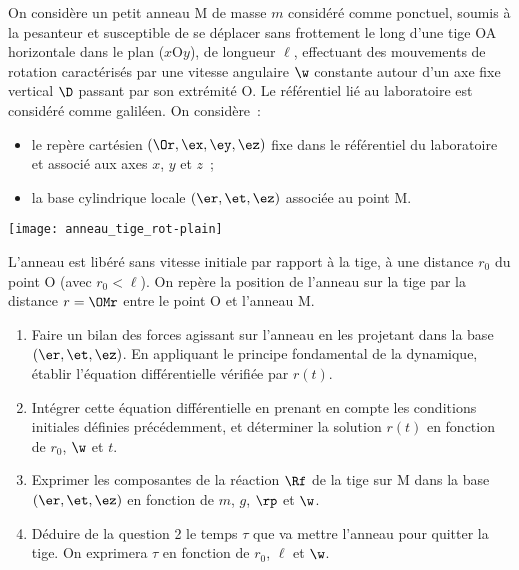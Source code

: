 \documentclass[a4paper, 12pt, final, garamond]{book}
\begin{document}
\hspace*{-0.75cm}
\begin{minipage}{0.70\linewidth}
    On considère un petit anneau M de masse $m$ considéré comme ponctuel, soumis
    à la pesanteur et susceptible de se déplacer sans frottement le long d'une
    tige OA horizontale dans le plan ($x$O$y$), de longueur $\ell$, effectuant
    des mouvements de rotation caractérisés par une vitesse angulaire $\w$
    constante autour d'un axe fixe vertical $\D$ passant par son extrémité O. Le
    référentiel lié au laboratoire est considéré comme galiléen. On considère~:
    \bigbreak
    \begin{itemize}
        \item le repère cartésien $(\Or,\ex,\ey,\ez)$ fixe dans le référentiel
            du laboratoire et associé aux axes $x$, $y$ et $z$~;
        \item la base cylindrique locale $(\er,\et,\ez)$ associée au point M.
    \end{itemize}
    \bigbreak
\end{minipage}
\hfill
\begin{minipage}{0.25\linewidth}
    \begin{center}
        \texttt{[image: anneau\_tige\_rot-plain]}
    \end{center}
\end{minipage}
L'anneau est libéré sans vitesse initiale par rapport à la tige, à une
distance $r_0$ du point O (avec $r_0 < \ell$). On repère la position de
l'anneau sur la tige par la distance $r = \OMr$ entre le point O et l'anneau
M.
\bigbreak
\begin{enumerate}
    \item Faire un bilan des forces agissant sur l'anneau en les projetant dans
        la base $(\er,\et,\ez)$. En appliquant le
        principe fondamental de la dynamique, établir l'équation différentielle
        vérifiée par $r(t)$.
    \item Intégrer cette équation différentielle en prenant en compte les
        conditions initiales définies précédemment, et déterminer la solution
        $r(t)$ en fonction de $r_0$, $\w$ et $t$.
    \item Exprimer les composantes de la réaction $\Rf$ de la tige sur M dans la
        base $(\er,\et,\ez)$ en fonction de $m$, $g$, $\rp$ et $\w$.
    \item Déduire de la question 2 le temps $\tau$ que va mettre l'anneau pour
        quitter la tige. On exprimera $\tau$ en fonction de $r_0$, $\ell$ et
        $\w$.
\end{enumerate}
\end{document}
